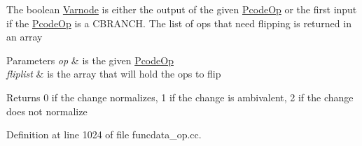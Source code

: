 The boolean \mbox{\hyperlink{class_varnode}{Varnode}} is either the output of the given \mbox{\hyperlink{class_pcode_op}{Pcode\+Op}} or the first input if the \mbox{\hyperlink{class_pcode_op}{Pcode\+Op}} is a C\+B\+R\+A\+N\+CH. The list of ops that need flipping is returned in an array 
\begin{DoxyParams}{Parameters}
{\em op} & is the given \mbox{\hyperlink{class_pcode_op}{Pcode\+Op}} \\
\hline
{\em fliplist} & is the array that will hold the ops to flip \\
\hline
\end{DoxyParams}
\begin{DoxyReturn}{Returns}
0 if the change normalizes, 1 if the change is ambivalent, 2 if the change does not normalize 
\end{DoxyReturn}


Definition at line 1024 of file funcdata\+\_\+op.\+cc.


